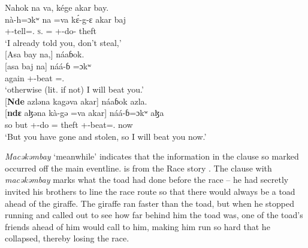 \clearpage
\ea \label{ex:12:60}	
Nahok  na  va,  kége  akar  bay.\\   
\gll  nà-h=ɔkʷ na =va k\'{ɛ}-g-ɛ akar baj  \\    
      {\oneS}+{\PFV}-tell={\twoS}.{\IO}    \textsc{s}.{\DO}   ={\PRF}  {\twoS}+{\IFV}-do-{\CL}  theft  {\NEG}\\     
\glt ‘I already told you, don’t steal,’\\

\medskip
{}[Asa  bay  na,]  náaɓok.\\
\gll {}[asa baj na]  náá-ɓ =ɔkʷ \\ 
     again {\NEG}  {\PSP}  {}{\oneS}+{\POT}{}-beat ={\twoS}.{\IO}\\ 
\glt ‘otherwise (lit. if not) I will beat you.’\\

\medskip
{}[\textbf{Nde} azləna  kagəva  akar]  náaɓok  azla.\\
\gll {}[\textbf{ndɛ} aɮəna kà-gə =va akar] náá-ɓ=ɔkʷ  aɮa\\
     so  but {\twoS}+{\PFV}-do   ={\PRF}  theft  {\oneS}+{\POT}-beat={\twoS}.{\IO}  now\\
\glt  ‘But you have gone and stolen, so I will beat you now.’  
\z 

\largerpage
\textit{Macəkəmbay } ‘meanwhile’ indicates that the information in the clause so marked occurred off the main eventline.  is from the Race story \citep{Friesen2003}. The clause with \textit{macəkəmbay} marks what the toad had done before the race -- he had secretly invited his brothers to line the race route so that there would always be a toad ahead of the giraffe. The giraffe ran faster than the toad, but when he stopped running and called out to see how far behind him the toad was, one of the toad’s friends ahead of him would call to him, making him run so hard that he collapsed, thereby losing the race. 

